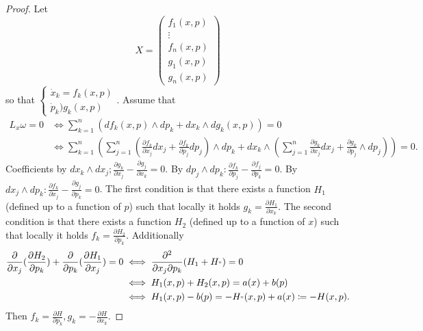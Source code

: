 \documentclass[a4paper, 11pt]{article}
\begin{document}
\begin{proof}
	Let 
	\[
		X = \begin{pmatrix}
			f_1(x,p) \\ \vdots \\ f_n(x,p) \\ g_1(x,p) \\ g_n(x,p)
		\end{pmatrix}
	\]
	so that $\begin{cases}
		\dot x_k = f_k(x,p) \\ \dot p_k ) g_k(x,p)
	\end{cases}$. 
	Assume that
	\begin{align*}
	L_x\omega = 0 &\iff \sum_{k=1}^n (df_k(x,p) \land dp_k + dx_k \land dg_k(x,p)) = 0\\
	 &\iff \sum^n_{k=1}(\sum^n_{j=1} (\frac{\partial f_k}{\partial x_j} dx_j + \frac{\partial f_k}{\partial p_j} dp_j) \land dp_k + dx_k \land 
	  (\sum_{j=1}^n \frac{\partial g_k}{\partial x_j} dx_j + \frac{\partial g_k}{\partial p_j}\land dp_j) ) = 0.
	\end{align*}
	Coefficients by $dx_k \land dx_j ; \frac{\partial g_k}{\partial x_j} - \frac{\partial g_j}{\partial x_k} = 0$. By $dp_j \land dp_k: \frac{\partial f_k}{\partial p_j} - \frac{\partial f_j}{\partial p_k} = 0$. By $dx_j \land dp_k: \frac{\partial f_k}{\partial x_j} - \frac{\partial g_j}{\partial p_k} = 0$. The first condition is that there exists a function $H_1$ (defined up to a function of $p$) such that locally it holds $g_k = \frac{\partial H_1}{\partial x_k}$. The second condition is that there exists a function $H_2$ (defined up to a function of $x$) such that locally it holds $f_k = \frac{\partial H_2}{\partial p_k}$. Additionally 
	\begin{align*}
		\frac{\partial}{\partial x_j} (\frac{\partial H_2}{\partial p_k}) + \frac{\partial }{\partial p_k} (\frac{\partial H_1}{\partial x_j}) = 0 &\iff \frac{\partial^2}{\partial x_j \partial p_k} (H_1 + H_") = 0 \\
		&\iff H_1(x,p) + H_2(x,p) = a(x) + b(p) \\
		& \iff H_1(x,p) - b(p ) = -H_"(x,p) + a(x) \coloneqq -H(x,p).
	\end{align*} 
	Then $f_k = \frac{\partial H}{\partial p_k} , g_k = -\frac{\partial H}{\partial x_k}$.
\end{proof}
\end{document}
